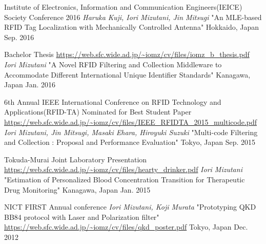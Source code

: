 \begin{cventries}
  \cventry
    {Institute of Electronics, Information and Communication Engineers(IEICE) Society Conference 2016} %
    {{\fontsize{8pt}{1em}\bodyfont\slshape\color{graytext} Haruka Kuji, Iori Mizutani, Jin Mitsugi} "An MLE-based RFID Tag Localization with Mechanically Controlled Antenna"} %
    {Hokkaido, Japan} %
    {Sep. 2016} %
    {
      \begin{cvitems}
      \end{cvitems}
    }

  \cventry
    {Bachelor Thesis \url{https://web.sfc.wide.ad.jp/~iomz/cv/files/iomz_b_thesis.pdf}} %
    {{\fontsize{8pt}{1em}\bodyfont\slshape\color{graytext} Iori Mizutani} "A Novel RFID Filtering and Collection Middleware to Accommodate Different International Unique Identifier Standards"} %
    {Kanagawa, Japan} %
    {Jan. 2016} %
    {
      \begin{cvitems}
      \end{cvitems}
    }

  \cventry
    {6th Annual IEEE International Conference on RFID Technology and Applications(RFID-TA) \*Nominated for Best Student Paper \url{https://web.sfc.wide.ad.jp/~iomz/cv/files/IEEE_RFIDTA_2015_multicode.pdf}} %
    {{\fontsize{8pt}{1em}\bodyfont\slshape\color{graytext} Iori Mizutani, Jin Mitsugi, Masaki Ehara, Hiroyuki Suzuki} "Multi-code Filtering and Collection : Proposal and Performance Evaluation"} %
    {Tokyo, Japan} %
    {Sep. 2015} %
    {
      \begin{cvitems}
      \end{cvitems}
    }

  \cventry
    {Tokuda-Murai Joint Laboratory Presentation \url{https://web.sfc.wide.ad.jp/~iomz/cv/files/hearty_drinker.pdf}} %
    {{\fontsize{8pt}{1em}\bodyfont\slshape\color{graytext} Iori Mizutani} "Estimation of Personalized Blood Concentration Transition for Therapeutic Drug Monitoring"} %
    {Kanagawa, Japan} %
    {Jan. 2015} %
    {
      \begin{cvitems}
      \end{cvitems}
    }

  \cventry
    {NICT FIRST Annual conference} %
    {{\fontsize{8pt}{1em}\bodyfont\slshape\color{graytext} Iori Mizutani, Koji Murata} "Prototyping QKD BB84 protocol with Laser and Polarization filter" \url{https://web.sfc.wide.ad.jp/~iomz/cv/files/qkd_poster.pdf}} %
    {Tokyo, Japan} %
    {Dec. 2012} %
    {
      \begin{cvitems}
      \end{cvitems}
    }


\end{cventries}
